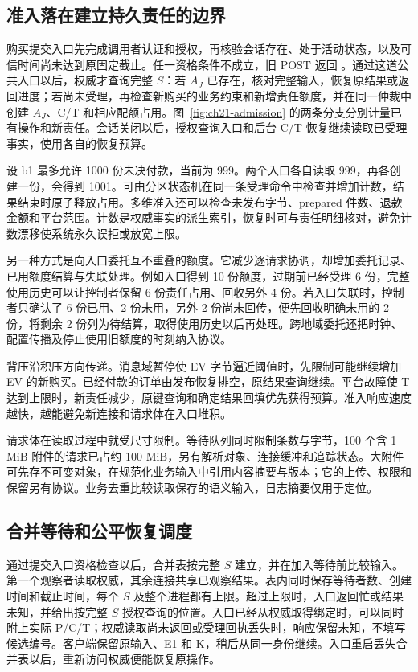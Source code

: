 \subsection{准入落在建立持久责任的边界}

购买提交入口先完成调用者认证和授权，再核验会话存在、处于活动状态，以及可信时间尚未达到原固定截止。任一资格条件不成立，旧 POST 返回 。通过这道公共入口以后，权威才查询完整 $S$：若 $A_J$ 已存在，核对完整输入，恢复原结果或返回进度；若尚未受理，再检查新购买的业务约束和新增责任额度，并在同一仲裁中创建 $A_J$、C/T 和相应配额占用。图~\ref{fig:ch21-admission} 的两条分支分别计量已有操作和新责任。会话关闭以后，授权查询入口和后台 C/T 恢复继续读取已受理事实，使用各自的恢复预算。


设 b1 最多允许 1000 份未决付款，当前为 999。两个入口各自读取 999，再各创建一份，会得到 1001。可由分区状态机在同一条受理命令中检查并增加计数，结果结束时原子释放占用。多维准入还可以检查未发布字节、prepared 件数、退款金额和平台范围。计数是权威事实的派生索引，恢复时可与责任明细核对，避免计数漂移使系统永久误拒或放宽上限。

另一种方式是向入口委托互不重叠的额度。它减少逐请求协调，却增加委托记录、已用额度结算与失联处理。例如入口得到 10 份额度，过期前已经受理 6 份，完整使用历史可以让控制者保留 6 份责任占用、回收另外 4 份。若入口失联时，控制者只确认了 6 份已用、2 份未用，另外 2 份尚未回传，便先回收明确未用的 2 份，将剩余 2 份列为待结算，取得使用历史以后再处理。跨地域委托还把时钟、配置传播及停止使用旧额度的时刻纳入协议。

背压沿积压方向传递。消息域暂停使 EV 字节逼近阈值时，先限制可能继续增加 EV 的新购买。已经付款的订单由发布恢复排空，原结果查询继续。平台故障使 T 达到上限时，新责任减少，原键查询和确定结果回填优先获得预算。准入响应速度越快，越能避免新连接和请求体在入口堆积。

请求体在读取过程中就受尺寸限制。等待队列同时限制条数与字节，100 个含 1 MiB 附件的请求已占约 100 MiB，另有解析对象、连接缓冲和追踪状态。大附件可先存不可变对象，在规范化业务输入中引用内容摘要与版本；它的上传、权限和保留另有协议。业务去重比较读取保存的语义输入，日志摘要仅用于定位。

\subsection{合并等待和公平恢复调度}

通过提交入口资格检查以后，合并表按完整 $S$ 建立，并在加入等待前比较输入。第一个观察者读取权威，其余连接共享已观察结果。表内同时保存等待者数、创建时间和截止时间，每个 $S$ 及整个进程都有上限。超过上限时，入口返回忙或结果未知，并给出按完整 $S$ 授权查询的位置。入口已经从权威取得绑定时，可以同时附上实际 P/C/T；权威读取尚未返回或受理回执丢失时，响应保留未知，不填写候选编号。客户端保留原输入、E1 和 K，稍后从同一身份继续。入口重启丢失合并表以后，重新访问权威便能恢复原操作。

